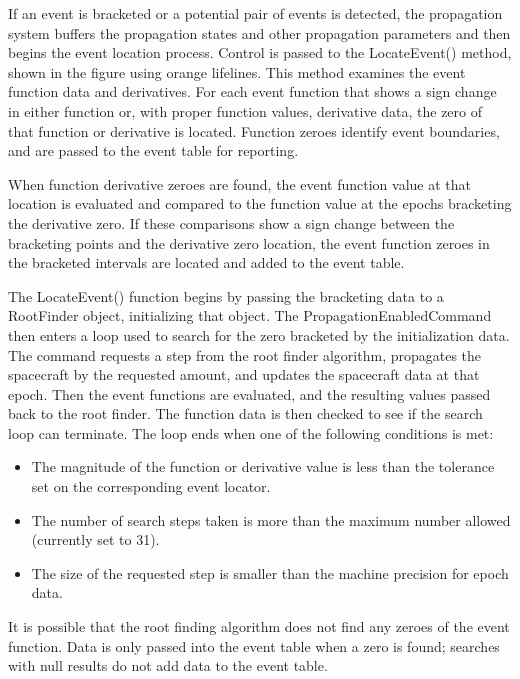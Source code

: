 \documentclass[letterpaper,10pt]{article}
\begin{document}
If an event is bracketed or a potential pair of events is detected, the
propagation system buffers the propagation states and other propagation
parameters and then begins the event location process. Control is passed to the
LocateEvent() method, shown in the figure using orange lifelines.  This method
examines the event function data and derivatives.  For each event function that
shows a sign change in either function or, with proper function values,
derivative data, the zero of that function or derivative is located. Function
zeroes identify event boundaries, and are passed to the event table for
reporting.  

When function derivative zeroes are found, the event function value at that
location is evaluated and compared to the function value at the epochs
bracketing the derivative zero.  If these comparisons show a sign change between
the bracketing points and the derivative zero location, the event function
zeroes in the bracketed intervals are located and added to the event table.

The LocateEvent() function begins by passing the bracketing data to a
RootFinder object, initializing that object.  The PropagationEnabledCommand then
enters a loop used to search for the zero bracketed by the initialization data.
The command requests a step from the root finder algorithm, propagates the
spacecraft by the requested amount, and updates the spacecraft data at that
epoch.  Then the event functions are evaluated, and the resulting values passed
back to the root finder.  The function data is then checked to see if the
search loop can terminate.  The loop ends when one of the following conditions
is met:

\begin{itemize}
\item The magnitude of the function or derivative value is less than the
tolerance set on the corresponding event locator.
\item  The number of search steps taken is more than the maximum number allowed
(currently set to 31).
\item The size of the requested step is smaller than the machine precision for
epoch data.
\end{itemize}
  
\noindent It is possible that the root finding algorithm does not find any
zeroes of the event function.  Data is only passed into the event table when a
zero is found; searches with null results do not add data to the event table. 
\end{document}
